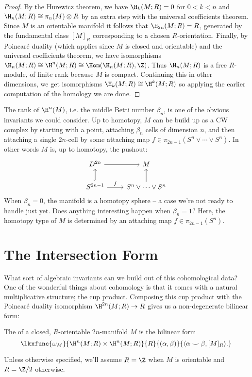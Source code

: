\begin{proof}
By the Hurewicz theorem, we have $\H_k(M; R)=0$ for $0<k<n$ and $\H_n(M; R)\cong \pi_n(M)\otimes R$ by an extra step with the universal coefficients theorem. Since $M$ is an orientable manifold it follows that $\H_{2n}(M; R)=R$, generated by the fundamental class $[M]_R$ corresponding to a chosen $R$-orientation.
Finally, by Poincar\'e duality (which applies since $M$ is closed and orientable) and the universal coefficients theorem, we have isomorphisms $\H_n(M; R)\cong \H^n(M; R)\cong \Hom(\H_n(M; R), \Z)$. Thus $\H_n(M;R)$ is a free $R$-module, of finite rank because $M$ is compact. Continuing this in other dimensions, we get isomorphisms $\H_k(M; R)\cong \H^k(M; R)$ so applying the earlier computation of the homology we are done.
\end{proof}

The rank of $\H^n(M)$, i.e. the middle Betti number $\beta_n$, is one of the obvious invariants we could consider. Up to homotopy, $M$ can be build up as a CW complex by starting with a point, attaching $\beta_n$ cells of dimension $n$, and then attaching a single $2n$-cell by some attaching map $f \in \pi_{2n-1}(S^n\vee \cdots \vee S^n)$. In other words $M$ is, up to homotopy, the pushout:
\[\begin{tikzcd}
		{D^{2n}} & M \\
		{S^{2n-1}} & {S^n \vee \cdots \vee S^n}
		\arrow[from=1-1, to=1-2]
		\arrow[hook, from=2-1, to=1-1]
		\arrow["f", from=2-1, to=2-2]
		\arrow[from=2-2, to=1-2]
	\end{tikzcd}\]
	When $\beta_n=0$, the manifold is a homotopy sphere -- a case we're not ready to handle just yet. Does anything interesting happen when $\beta_n=1$? Here, the homotopy type of $M$ is determined by an attaching map $f\in \pi_{2n-1}(S^n)$. 


\section{The Intersection Form}


What sort of algebraic invariants can we build out of this cohomological data? One of the wonderful things about cohomology is that it comes with a natural multiplicative structure; the cup product. Composing this cup product with the Poincar\'e duality isomorphism $\H^{2n}(M; R) \to R$ gives us a non-degenerate bilinear form:
\begin{definition}\label{def:intersection-form}
	The  of a closed, $R$-orientable $2n$-manifold $M$ is the bilinear form
	\[
		\lkxfunc{\omega_M}{\H^n(M;R)\times \H^n(M; R)}{R}{(\alpha,\beta)}{\langle\alpha\smile\beta, [M]_R\rangle.}
	\]
\end{definition}
\begin{note*}
	Unless otherwise specified, we'll assume $R=\Z$ when $M$ is orientable and $R=\Z/2$ otherwise.
\end{note*}


